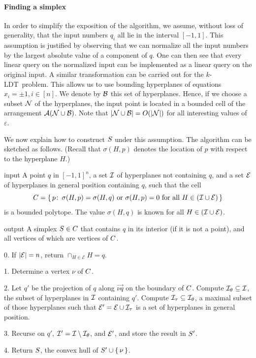 \paragraph{Finding a simplex}

In order to simplify the exposition of the algorithm, we assume, without
loss of generality, that the input numbers $q_i$ all lie in the interval $[-1,1]$.
This assumption is justified by observing that we can normalize all the input
numbers by the largest absolute value of a component of $q$. One can then see that
every linear query on the normalized input can be implemented
as a linear query on the original input. A similar transformation can be carried out
for the \(k\)-LDT\ problem.
This allows us to use bounding hyperplanes of equations $x_i = \pm 1, i\in [n]$.
We denote by $\mathcal{B}$ this set of hyperplanes. Hence, if we choose a subset
\(\mathcal{N}\) of the hyperplanes, the input point is located in a bounded cell
of the arrangement \(\mathcal{A}(\mathcal{N} \cup \mathcal{B})\). Note that \(|{\mathcal{N} \cup
\mathcal{B}}| = O(|{\mathcal{N}}|)\) for all interesting values of \(\varepsilon\).

We now explain how to construct \(\simplex\) under this assumption. The algorithm
can be sketched as follows. (Recall that $\sigma(H,p)$ denotes the location
of $p$ with respect to the hyperplane $H$.)

\begin{algorithm}%
[Constructing \(\simplex\)]%
\label{algo:simplex}
\item[input] A point \(q\) in ${[-1,1]}^n$, a set $\mathcal{I}$ of hyperplanes not
	containing \(q\), and a set $\mathcal{E}$ of hyperplanes in general position
	containing \(q\), such that the cell
	$$
	C = \{\,p \colon\, \sigma(H,p) = \sigma(H,q)
			\ \text{or}\ \sigma(H,p) = 0
			\ \text{for all}\ H \in (\mathcal{I} \cup \mathcal{E})
		\,\}
	$$
	is a bounded polytope. The value \(\sigma(H,q)\) is known for
	all \(H \in (\mathcal{I} \cup \mathcal{E})\). %
\item[output] A simplex \(S \in C\) that contains \(q\) in
	its interior (if it is not a point), and all vertices
	of which are vertices of \(C\).
\item[0.] If $|{\mathcal{E}}|=n$, return $ \cap_{H \in \mathcal{E}} H = q$.
\item[1.] Determine a vertex \(\nu\) of $C$.
\item[2.] Let \(q'\) be the projection of \(q\) along \(\vec{\nu q}\) on the
	boundary of \(C\). Compute \(\mathcal{I}_\theta \subseteq \mathcal{I}\), the subset of
	hyperplanes in \(\mathcal{I}\) containing \(q'\). Compute \(\mathcal{I}_{\tau} \subseteq
	\mathcal{I}_{\theta}\), a maximal subset of those hyperplanes such that \(\mathcal{E}' = \mathcal{E}
	\cup \mathcal{I}_\tau\) is a set of hyperplanes in general position.
\item[3.] Recurse on \(q'\), \(\mathcal{I}' = \mathcal{I} \setminus \mathcal{I}_\theta\), and \(\mathcal{E}'\), and
	store the result in \(S'\).
\item[4.] Return $\simplex$, the convex hull of \(S' \cup \left\{\,{\nu}\,\right\}\).
\end{algorithm}

